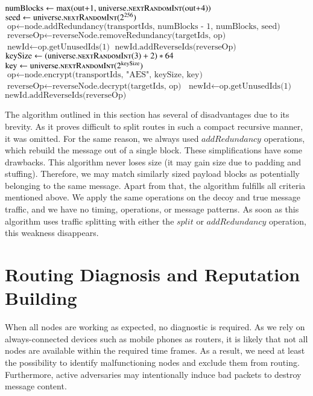 \begin{breakablealgorithm}
\begin{algorithmic}[1]
		\State $\text{numBlocks} \gets \text{max(out+1, universe.\Call{nextRandomInt}{out+4})}$
		\State $\text{seed} \gets \text{universe}.\Call{nextRandomInt}{2^{256}}$
		\State $\text{op} \gets \text{node.addRedundancy(transportIds, numBlocks - 1, numBlocks, seed)}$
		\State $\text{reverseOp} \gets \text{reverseNode.removeRedundancy(targetIds, op)}$
		\State $\text{newId} \gets \text{op.getUnusedIds(1)}$
		\State $\text{newId.addReverseIds(reverseOp)}$
		\EndIf	
		\Else
		\State $\text{keySize}   \gets (\text{universe}.\Call{nextRandomInt}{3}+2)*64$
		\State $\text{key}       \gets \text{universe}.\Call{nextRandomInt}{2^{\text{keySize}}}$
		\State $\text{op}        \gets \text{node.encrypt(transportIds, "AES", keySize, key)}$
		\State $\text{reverseOp} \gets \text{reverseNode.decrypt(targetIds, op)}$
		\State $\text{newId}     \gets \text{op.getUnusedIds(1)}$
		\State $\text{newId.addReverseIds(reverseOp)}$
		\EndIf	
		\EndIf
		\EndFunction\label{alg:endAssignOperation-line}
	\end{algorithmic}
\end{breakablealgorithm}

The algorithm outlined in this section has several of disadvantages due to its brevity. As it proves difficult to split routes in such a compact recursive manner, it was omitted. For the same reason, we always used $addRedundancy$ operations, which rebuild the message out of a single block. These simplifications have some drawbacks. This algorithm never loses size (it may gain size due to padding and stuffing). Therefore, we may match similarly sized payload blocks as potentially belonging to the same message. Apart from that, the algorithm fulfills all criteria mentioned above. We apply the same operations on the decoy and true message traffic, and we have no timing, operations, or message patterns. As soon as this algorithm uses traffic splitting with either the $split$ or $addRedundancy$ operation, this weakness disappears.

\section{Routing Diagnosis and Reputation Building\label{sec:diagnosisOfMessagePath}}
When all nodes are working as expected, no diagnostic is required. As we rely on always-connected devices such as mobile phones as routers, it is likely that not all nodes are available within the required time frames. As a result, we need at least the possibility to identify malfunctioning nodes and exclude them from routing. Furthermore, active adversaries may intentionally induce bad packets to destroy message content.

